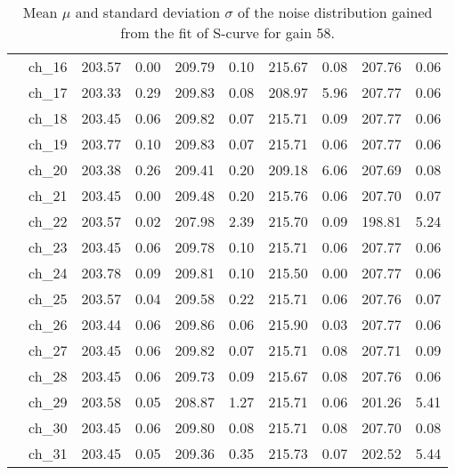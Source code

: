 \begin{table}[H]
{\begin{tabular}{|c|c|c|c|c|c|c|c|c|c|}
    &ch\_16 & 203.57 & 0.00 & 209.79 & 0.10 & 215.67 & 0.08 & 207.76 & 0.06 \\
    &ch\_17 & 203.33 & 0.29 & 209.83 & 0.08 & 208.97 & 5.96 & 207.77 & 0.06 \\
    &ch\_18 & 203.45 & 0.06 & 209.82 & 0.07 & 215.71 & 0.09 & 207.77 & 0.06 \\
    &ch\_19 & 203.77 & 0.10 & 209.83 & 0.07 & 215.71 & 0.06 & 207.77 & 0.06 \\
    &ch\_20 & 203.38 & 0.26 & 209.41 & 0.20 & 209.18 & 6.06 & 207.69 & 0.08 \\
    &ch\_21 & 203.45 & 0.00 & 209.48 & 0.20 & 215.76 & 0.06 & 207.70 & 0.07 \\
    &ch\_22 & 203.57 & 0.02 & 207.98 & 2.39 & 215.70 & 0.09 & 198.81 & 5.24 \\
    &ch\_23 & 203.45 & 0.06 & 209.78 & 0.10 & 215.71 & 0.06 & 207.77 & 0.06 \\
    &ch\_24 & 203.78 & 0.09 & 209.81 & 0.10 & 215.50 & 0.00 & 207.77 & 0.06 \\
    &ch\_25 & 203.57 & 0.04 & 209.58 & 0.22 & 215.71 & 0.06 & 207.76 & 0.07 \\
    &ch\_26 & 203.44 & 0.06 & 209.86 & 0.06 & 215.90 & 0.03 & 207.77 & 0.06 \\
    &ch\_27 & 203.45 & 0.06 & 209.82 & 0.07 & 215.71 & 0.08 & 207.71 & 0.09 \\
    &ch\_28 & 203.45 & 0.06 & 209.73 & 0.09 & 215.67 & 0.08 & 207.76 & 0.06 \\
    &ch\_29 & 203.58 & 0.05 & 208.87 & 1.27 & 215.71 & 0.06 & 201.26 & 5.41 \\
    &ch\_30 & 203.45 & 0.06 & 209.80 & 0.08 & 215.71 & 0.08 & 207.70 & 0.08 \\
    &ch\_31 & 203.45 & 0.05 & 209.36 & 0.35 & 215.73 & 0.07 & 202.52 & 5.44 \\
    \hline
     
\end{tabular}
}
\caption{Mean $\mu$ and standard deviation $\sigma$ of the noise distribution gained from the fit of S-curve for gain 58.}

\end{table}


